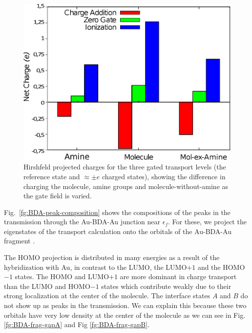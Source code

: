 \documentclass[aip,jcp,a4paper,reprint,floatfix,superscriptaddress]{revtex4-1}
\begin{document}
\begin{figure}
\includegraphics[width=.8\columnwidth]{img/gating-BDA-GGA-N}
\caption{Hirshfeld projected charges for the three gated transport levels (the reference state and $\approx\pm e$ charged states), showing the difference in charging the molecule, amine groups and molecule-without-amine as the gate field is varied.} \label{fg:gated_charges_BDA}
\end{figure}

Fig.~\ref{fg:BDA-peak-composition} shows the compositions of the peaks in the transmission through the Au-BDA-Au junction near $\epsilon_{f}$. For these, we project the eigenstates of the transport calculation onto the orbitals of the Au-BDA-Au fragment \cite{Verzijl2012}.


The HOMO projection is distributed in many energies as a result of the hybridization with Au, in contrast to the LUMO, the LUMO$+1$ and the HOMO$-1$ states. The HOMO and LUMO$+1$ are more dominant in charge transport than the LUMO and HOMO$-1$ states which contribute weakly due to their strong localization at the center of the molecule. The interface states ${A}$ and ${B}$ do not show up as peaks in the transmission. We can explain this because these two orbitals have very low density at the center of the molecule as we can see in Fig. \ref{fg:BDA-frag-gapA} and Fig \ref{fg:BDA-frag-gapB}. %
\end{document}
